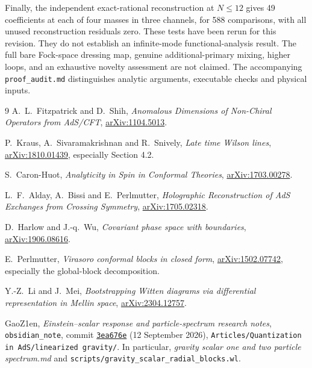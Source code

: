 \documentclass[11pt,a4paper]{article}
\numberwithin{equation}{section}
\theoremstyle{remark}\newtheorem{remark}[theorem]{Remark}
\newcommand{\arxiv}[1]{\href{https://arxiv.org/abs/#1}{arXiv:#1}}
\begin{document}
Finally, the independent exact-rational reconstruction at $N\leq12$ gives 49 coefficients at each of four masses in three channels, for 588 comparisons, with all unused reconstruction residuals zero. These tests have been rerun for this revision. They do not establish an infinite-mode functional-analysis result. The full bare Fock-space dressing map, genuine additional-primary mixing, higher loops, and an exhaustive novelty assessment are not claimed. The accompanying \texttt{proof\_audit.md} distinguishes analytic arguments, executable checks and physical inputs.

\begin{thebibliography}{9}
A.~L.~Fitzpatrick and D.~Shih,
\emph{Anomalous Dimensions of Non-Chiral Operators from AdS/CFT},
\arxiv{1104.5013}.

P.~Kraus, A.~Sivaramakrishnan and R.~Snively,
\emph{Late time Wilson lines},
\arxiv{1810.01439}, especially Section 4.2.

S.~Caron-Huot,
\emph{Analyticity in Spin in Conformal Theories},
\arxiv{1703.00278}.

L.~F.~Alday, A.~Bissi and E.~Perlmutter,
\emph{Holographic Reconstruction of AdS Exchanges from Crossing Symmetry},
\arxiv{1705.02318}.

D.~Harlow and J.-q.~Wu,
\emph{Covariant phase space with boundaries},
\arxiv{1906.08616}.

E.~Perlmutter,
\emph{Virasoro conformal blocks in closed form},
\arxiv{1502.07742}, especially the global-block decomposition.

Y.-Z.~Li and J.~Mei,
\emph{Bootstrapping Witten diagrams via differential representation in Mellin space},
\arxiv{2304.12757}.

GaoZ1en, \emph{Einstein--scalar response and particle-spectrum research notes},
\texttt{obsidian\_note}, commit
\href{https://github.com/GaoZ1en/obsidian_note/commit/3ea676ef5a43cd11a18f551b0adcac222abc8b9a}{\texttt{3ea676e}} (12 September 2026),
\texttt{Articles/Quantization in AdS/linearized gravity/}.
In particular, \emph{gravity scalar one and two particle spectrum.md} and
\texttt{scripts/gravity\_scalar\_radial\_blocks.wl}.
\end{thebibliography}
\end{document}
